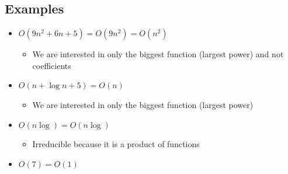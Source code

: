 \documentclass[hidelinks,11pt]{article}
\begin{document}
\subsection{Examples}
\begin{itemize}
    \item $O(9n^2+6n+5) = O(9n^2) = O(n^2)$ 
    \begin{itemize}
        \item We are interested in only the biggest function (largest power) and not coefficients
    \end{itemize} 
    \item $O(n+\log n +5) = O(n)$ 
    \begin{itemize}
        \item We are interested in only the biggest function (largest power)
    \end{itemize} 
    \item $O(n\log) = O(n\log)$ \begin{itemize}
        \item Irreducible because it is a product of functions
    \end{itemize} 
    \item $O(7) = O(1)$
\end{itemize}
\end{document}
